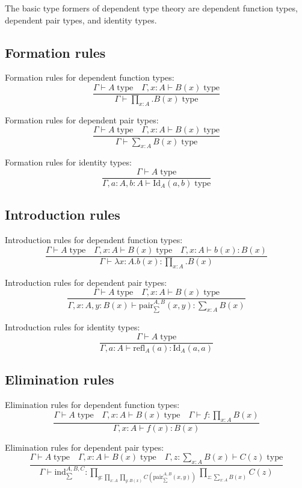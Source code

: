 \documentclass{book}
\begin{document}
The basic type formers of dependent type theory are dependent function types, dependent pair types, and identity types.

\subsection{Formation rules}

Formation rules for dependent function types:
$$\frac{\Gamma \vdash A \; \mathrm{type} \quad \Gamma, x:A \vdash B(x) \; \mathrm{type}}{\Gamma \vdash \prod_{x:A}.B(x) \; \mathrm{type}}$$

Formation rules for dependent pair types:
$$\frac{\Gamma \vdash A \; \mathrm{type} \quad \Gamma, x:A \vdash B(x) \; \mathrm{type}}{\Gamma \vdash \sum_{x:A} B(x) \; \mathrm{type}}$$

Formation rules for identity types:
$$\frac{\Gamma \vdash A \; \mathrm{type}}{\Gamma, a:A, b:A \vdash \mathrm{Id}_A(a, b) \; \mathrm{type}}$$

\subsection{Introduction rules}

Introduction rules for dependent function types:
$$\frac{\Gamma \vdash A \; \mathrm{type} \quad \Gamma, x:A \vdash B(x) \; \mathrm{type} \quad \Gamma, x:A \vdash b(x):B(x)}{\Gamma \vdash \lambda x:A.b(x):\prod_{x:A}.B(x)}$$

Introduction rules for dependent pair types:
$$\frac{\Gamma \vdash A \; \mathrm{type} \quad \Gamma, x:A \vdash B(x) \; \mathrm{type}}{\Gamma, x:A, y:B(x) \vdash \mathrm{pair}_{\sum}^{A, B}(x, y):\sum_{x:A} B(x)}$$

Introduction rules for identity types:
$$\frac{\Gamma \vdash A \; \mathrm{type}}{\Gamma, a:A \vdash \mathrm{refl}_A(a):\mathrm{Id}_A(a, a)}$$

\subsection{Elimination rules}

Elimination rules for dependent function types:
$$\frac{\Gamma \vdash A \; \mathrm{type} \quad \Gamma, x:A \vdash B(x) \; \mathrm{type} \quad \Gamma \vdash f:\prod_{x:A} B(x)}{\Gamma, x:A \vdash f(x):B(x)}$$

Elimination rules for dependent pair types:
$$\frac{\Gamma \vdash A \; \mathrm{type} \quad \Gamma, x:A \vdash B(x) \; \mathrm{type} \quad \Gamma, z:\sum_{x:A} B(x) \vdash C(z) \; \mathrm{type}}{\Gamma \vdash \mathrm{ind}_{\sum}^{A, B, C}:\prod_{g:\prod_{x:A} \prod_{y:B(x)} C(\mathrm{pair}_{\sum}^{A, B}(x, y))} \prod_{z:\sum_{x:A} B(x)} C(z)}$$
\end{document}
